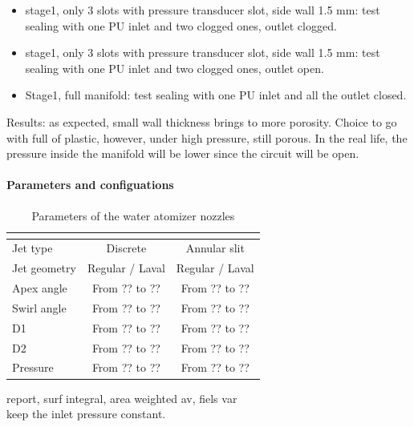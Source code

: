 \documentclass[../../main.tex]{subfiles}
\begin{document}
\begin{itemize}
    \item stage1, only 3 slots with pressure transducer slot, side wall 1.5 mm: test sealing with one PU inlet and two clogged ones, outlet clogged.
    \item stage1, only 3 slots with pressure transducer slot, side wall 1.5 mm: test sealing with one PU inlet and two clogged ones, outlet open.
    \item Stage1, full manifold: test sealing with one PU inlet and all the outlet closed.
\end{itemize}

Results: as expected, small wall thickness brings to more porosity. Choice to go with full of plastic, however, under high pressure, still porous. In the real life, the pressure 
inside the manifold will be lower since the circuit will be open.

\paragraph{Parameters and configuations}


\vspace{0mm}
\begin{table}[H]
    \centering
    \begin{tabular}{l c c}
        \toprule
        \textbf{} & \textbf{} & \textbf{}  \\
        \midrule
        Jet type & Discrete & Annular slit   \\
        Jet geometry & Regular / Laval & Regular / Laval   \\
        Apex angle & From ?? to ?? & From ?? to ??   \\
        Swirl angle & From ?? to ?? & From ?? to ?? \\
        D1 &From ?? to ?? & From ?? to ?? \\
        D2 & From ?? to ?? & From ?? to ??  \\
        Pressure & From ?? to ?? & From ?? to ??  \\
        \bottomrule
    \end{tabular}
    \caption{Parameters of the water atomizer nozzles}
    \label{}
\end{table}
\FloatBarrier
\vspace{0mm}

report, surf integral, area weighted av, fiels var\\
keep the inlet pressure constant.
\end{document}
